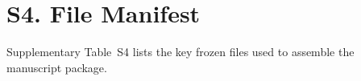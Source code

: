 \section{S4. File Manifest}

Supplementary Table~S4 lists the key frozen files used to assemble the manuscript package.



